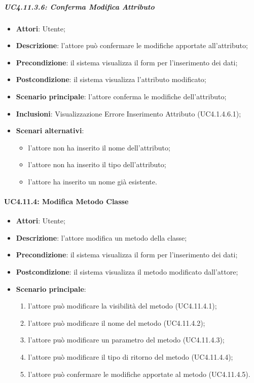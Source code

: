 \subparagraph{UC4.11.3.6: Conferma Modifica Attributo}
\label{UC4.11.3.6}
\begin{itemize}
	\item \textbf{Attori}: Utente;
	\item \textbf{Descrizione}: l'attore può confermare le modifiche apportate all'attributo;
	\item \textbf{Precondizione}: il sistema visualizza il form per l'inserimento dei dati;
	\item \textbf{Postcondizione}: il sistema visualizza l'attributo modificato;
	\item \textbf{Scenario principale}: l'attore conferma le modifiche dell'attributo;
	\item \textbf{Inclusioni}:
	Visualizzazione Errore Inserimento Attributo (UC4.1.4.6.1);
	\item \textbf{Scenari alternativi}:
	\begin{itemize}
	\item l'attore non ha inserito il nome dell'attributo;
	\item l'attore non ha inserito il tipo dell'attributo;
	\item l'attore ha inserito un nome già esistente.
	\end{itemize}
\end{itemize}

\paragraph{UC4.11.4: Modifica Metodo Classe}
\label{UC4.11.4}
\begin{itemize}
	\item \textbf{Attori}: Utente;
	\item \textbf{Descrizione}: l'attore modifica un metodo della classe;
	\item \textbf{Precondizione}: il sistema visualizza il form per l'inserimento dei dati;
	\item \textbf{Postcondizione}: il sistema visualizza il metodo modificato dall'attore;
	\item \textbf{Scenario principale}:
	\begin{enumerate}
		\item l'attore può modificare la visibilità del metodo (UC4.11.4.1);
		\item l'attore può modificare il nome del metodo (UC4.11.4.2);
		\item l'attore può modificare un parametro del metodo (UC4.11.4.3);
		\item l'attore può modificare il tipo di ritorno del metodo (UC4.11.4.4);
		\item l'attore può confermare le modifiche apportate al metodo (UC4.11.4.5).
	\end{enumerate}
\end{itemize}


